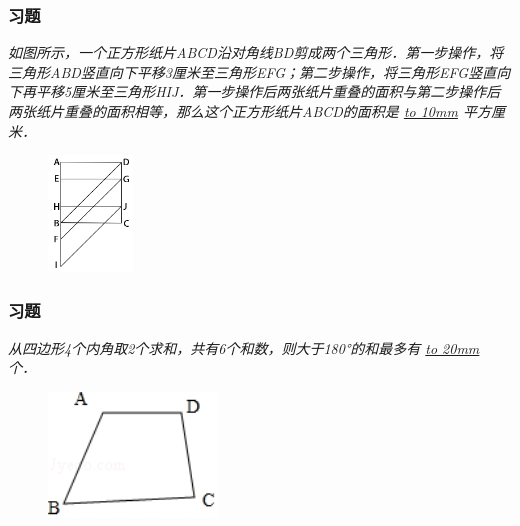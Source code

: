 \begin{frame}
    \frametitle{习题\theframecounter}
    \textit{如图所示，一个正方形纸片ABCD沿对角线BD剪成两个三角形．第一步操作，将三角形ABD竖直向下平移3厘米至三角形EFG；第二步操作，将三角形EFG竖直向下再平移5厘米至三角形HIJ．第一步操作后两张纸片重叠的面积与第二步操作后两张纸片重叠的面积相等，那么这个正方形纸片ABCD的面积是 \underline{\hbox to 10mm{}} 平方厘米．} 
    \begin{figure}[H] 
        \centering
        \includegraphics[width=0.2\textwidth]{./pics/Chapter_3/10.png}
    \end{figure}
\end{frame}

\begin{frame}
    \frametitle{习题\theframecounter}
    \vspace*{-1cm}
    \textit{从四边形4个内角取2个求和，共有6个和数，则大于180°的和最多有 \underline{\hbox to 20mm{}} 个．} 
    \begin{figure}[H] 
        \centering
        \includegraphics[width=0.4\textwidth]{./pics/Chapter_3/11.png}
    \end{figure}
\end{frame}

